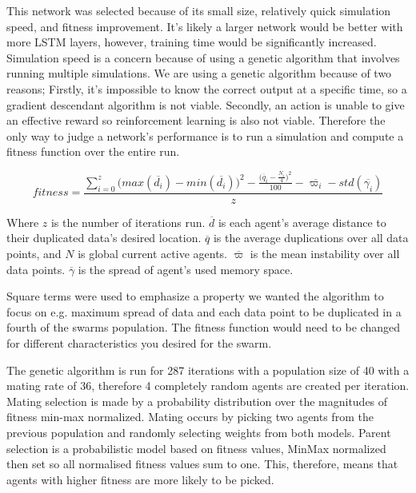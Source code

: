 \documentclass{UoYCSproject}
\begin{document}
This network was selected because of its small size, relatively quick simulation speed, and fitness improvement.
It’s likely a larger network would be better with more LSTM layers, however, training time would be significantly increased.
Simulation speed is a concern because of using a genetic algorithm that involves running multiple simulations.
We are using a genetic algorithm because of two reasons;
Firstly, it’s impossible to know the correct output at a specific time, so a gradient descendant algorithm is not viable.
Secondly, an action is unable to give an effective reward so reinforcement learning is also not viable.
Therefore the only way to judge a network's performance is to run a simulation and compute a fitness function over the entire run.

\begin{equation}
fitness = \frac{\sum_{i=0}^{z}{\big(max( \overline{d_{i}}) - min( \overline{d_{i}})\big)^{2} - \frac{\big( \overline{q}_{i} - \frac{N_{i}}{4} \big)^{2}}{100} } - \overline{ \varpi_{i} } - std( \overline{\gamma_{i}} )}{z}
\end{equation}

Where $z$ is the number of iterations run.
$\overline{d}$ is each agent’s average distance to their duplicated data’s desired location.
$\overline{q}$ is the average duplications over all data points, and $N$ is global current active agents.
$\overline{ \varpi }$ is the mean instability over all data points.
$\overline{\gamma}$ is the spread of agent's used memory space.

Square terms were used to emphasize a property we wanted the algorithm to focus on e.g. maximum spread of data and each data point to be duplicated in a fourth of the swarms population.
The fitness function would need to be changed for different characteristics you desired for the swarm.

The genetic algorithm is run for 287 iterations with a population size of 40 with a mating rate of 36, therefore 4 completely random agents are created per iteration.
Mating selection is made by a probability distribution over the magnitudes of fitness min-max normalized.
Mating occurs by picking two agents from the previous population and randomly selecting weights from both models.
Parent selection is a probabilistic model based on fitness values, MinMax normalized then set so all normalised fitness values sum to one.
This, therefore, means that agents with higher fitness are more likely to be picked.
\end{document}
